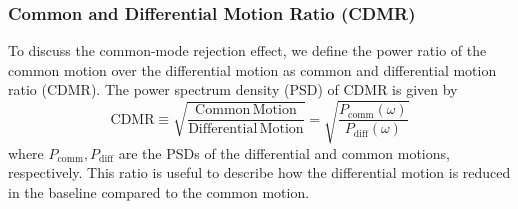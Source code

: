 \subsubsection{Common and Differential Motion Ratio (CDMR)}\label{sec:sec313}
To discuss the common-mode rejection effect, we define the power ratio of the common motion over the differential motion as common and differential motion ratio (CDMR). The power spectrum density (PSD) of CDMR is given by
\begin{equation}
  \mathrm{CDMR} \equiv \sqrt{\frac{\mathrm{Common\,Motion}}{\mathrm{Differential\,Motion}}} = \sqrt{\frac{P_{\mathrm{comm}}(\omega)}{P_{\mathrm{diff}}(\omega)}} \label{eq:eq23}
\end{equation}
where $P_{\mathrm{comm}},P_{\mathrm{diff}}$ are the PSDs of the differential and common motions, respectively. This ratio is useful to describe how the differential motion is reduced in the baseline compared to the common motion.

